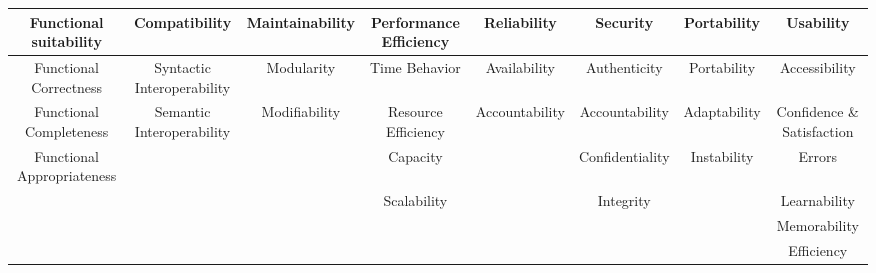 \documentclass{article}
\begin{document}
\begin{adjustbox}{width=1.7\textwidth,center=\textwidth}
    \begin{tabular}{ |c|c|c|c|c|c|c|c| }
        \hline
        Functional suitability     & Compatibility              & Maintainability & Performance Efficiency & Reliability    & Security        & Portability  & Usability                  \\
        \hline
        Functional Correctness     & Syntactic Interoperability & Modularity      & Time Behavior          & Availability   & Authenticity    & Portability  & Accessibility              \\
        \hline
        Functional Completeness    & Semantic Interoperability  & Modifiability   & Resource Efficiency    & Accountability & Accountability  & Adaptability & Confidence \& Satisfaction \\
        \hline
        Functional Appropriateness &                            &                 & Capacity               &                & Confidentiality & Instability  & Errors                     \\
        \hline
                                   &                            &                 & Scalability            &                & Integrity       &              & Learnability               \\
        \hline
                                   &                            &                 &                        &                &                 &              & Memorability               \\
        \hline
                                   &                            &                 &                        &                &                 &              & Efficiency                 \\
        \hline
    \end{tabular}
\end{adjustbox}
\end{document}
